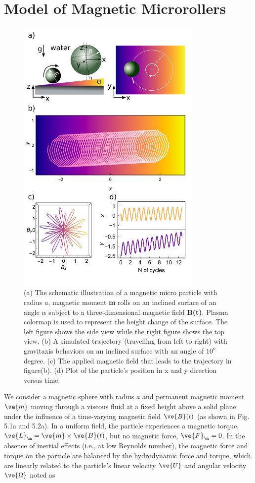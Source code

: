 \section{Model of  Magnetic Microrollers}
\begin{figure}[p]
\centering
\includegraphics[width=9cm]{figures/5_1.png}
\caption{ (a) The schematic illustration of a magnetic micro particle with radius $a$, magnetic moment \textbf{m} rolls on an inclined surface of an angle  $\alpha$ subject to a three-dimensional magnetic field \textbf{B(t)}. Plasma colormap is used to represent the height change of the surface. The left figure shows the side view while the right figure shows the top view. (b) A simulated trajectory (travelling from left to right) with gravitaxis behaviors on an inclined surface with an angle of $10^o$ degree. (c) The applied magnetic field that leads to the trajectory in figure(b). (d) Plot of the particle's position in x and y direction versus time.}
\label{fig:5.1}
\end{figure}
We consider a magnetic sphere with radius $a$ and permanent magnetic moment $\ve{m}$ moving through a viscous fluid at a fixed height above a solid plane under the influence of a time-varying magnetic field $\ve{B}(t)$ (as shown in Fig. 5.1a and 5.2a). In a uniform field, the particle experiences a magnetic torque, $\ve{L}_{\m}=\ve{m}\times\ve{B}(t)$, but no magnetic force, $\ve{F}_{\m}=0$. In the absence of inertial effects (i.e., at low Reynolds number), the magnetic force and torque on the particle are balanced by the hydrodynamic force and torque, which are linearly related to the particle's linear velocity $\ve{U}$ and angular velocity $\ve{\Omega}$ noted as
